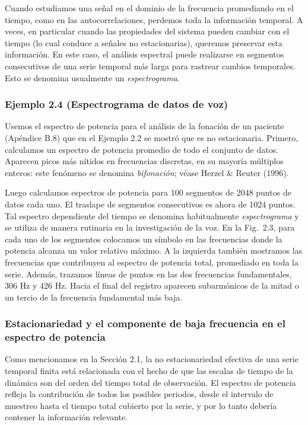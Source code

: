 \documentclass[10pt,a4paper]{book}
\begin{document}
Cuando estudiamos una señal en el dominio de la frecuencia promediando en el tiempo, como en las autocorrelaciones, perdemos toda la información temporal. A veces, en particular cuando las propiedades del sistema pueden cambiar con el tiempo (lo cual conduce a señales no estacionarias), queremos preservar esta información. En este caso, el análisis espectral puede realizarse en segmentos consecutivos de una serie temporal más larga para rastrear cambios temporales. Esto se denomina usualmente un \emph{espectrograma}.

\subsubsection*{Ejemplo 2.4 (Espectrograma de datos de voz)}
Usemos el espectro de potencia para el análisis de la fonación de un paciente (Apéndice B.8) que en el Ejemplo 2.2 se mostró que es no estacionaria. Primero, calculamos un espectro de potencia promedio de todo el conjunto de datos. Aparecen picos más nítidos en frecuencias discretas, en su mayoría múltiplos enteros: este fenómeno se denomina \emph{bifonación}; véase Herzel \& Reuter (1996).  

Luego calculamos espectros de potencia para 100 segmentos de 2048 puntos de datos cada uno. El traslape de segmentos consecutivos es ahora de 1024 puntos. Tal espectro dependiente del tiempo se denomina habitualmente \emph{espectrograma} y se utiliza de manera rutinaria en la investigación de la voz. En la Fig.~2.3, para cada uno de los segmentos colocamos un símbolo en las frecuencias donde la potencia alcanza un valor relativo máximo. A la izquierda también mostramos las frecuencias que contribuyen al espectro de potencia total, promediado en toda la serie. Además, trazamos líneas de puntos en las dos frecuencias fundamentales, 306 Hz y 426 Hz. Hacia el final del registro aparecen subarmónicos de la mitad o un tercio de la frecuencia fundamental más baja.

\newpage

\subsubsection{Estacionariedad y el componente de baja frecuencia en el espectro de potencia}

Como mencionamos en la Sección 2.1, la no estacionariedad efectiva de una serie temporal finita está relacionada con el hecho de que las escalas de tiempo de la dinámica son del orden del tiempo total de observación. El espectro de potencia refleja la contribución de todos los posibles periodos, desde el intervalo de muestreo hasta el tiempo total cubierto por la serie, y por lo tanto debería contener la información relevante.  
\end{document}
